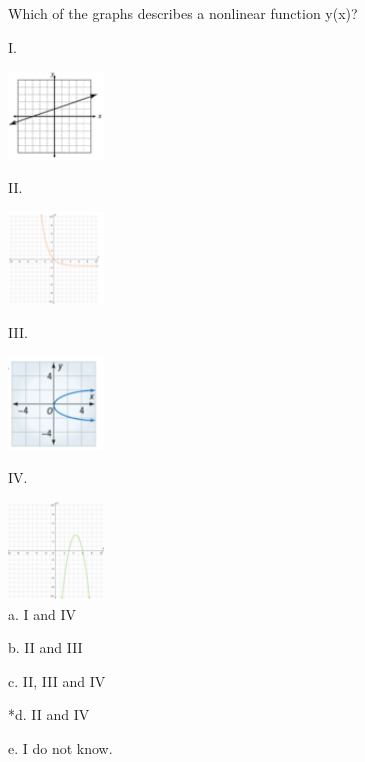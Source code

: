 
Which of the graphs describes a nonlinear function y(x)?

I. 

\includegraphics[width=1in]{../../Images/NonlinearEquationsQ10I.png}

II.
 
\includegraphics[width=1in]{../../Images/NonlinearEquationsQ10II.png}

III.
 
\includegraphics[width=1in]{../../Images/NonlinearEquationsQ10III.png}

IV. 

\includegraphics[width=1in]{../../Images/NonlinearEquationsQ10IV.png} \\

a. I and IV

b. II and III

c.  II, III and IV

*d. II and IV

e. I do not know. \\
